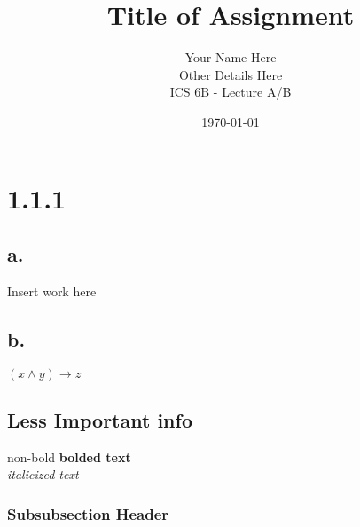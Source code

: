 \documentclass[letterpaper]{article}    %
\begin{document}

\title{Title of Assignment}             %
\author{Your Name Here\\                %
        Other Details Here\\
        ICS 6B - Lecture A/B}
\date{\today}                           %
\maketitle                              %

\section*{1.1.1}                        %
\subsection*{a.}                        %
Insert work here
\subsection*{b.}
$(x \land y) \to z$                     %
\pagebreak                              %

\begin{center}                          %
\section{Less Important info}           %
non-bold \textbf{bolded text}           %
\\\textit{italicized text}              %
\subsubsection{Subsubsection Header}    %
\end{center}                            %
\end{document}
